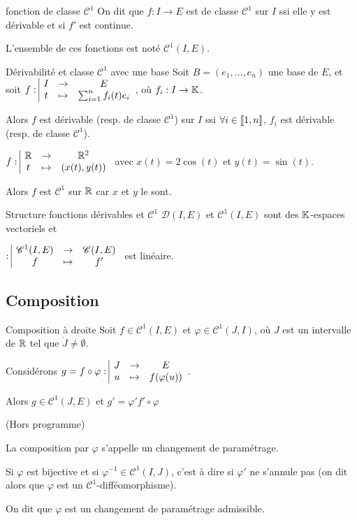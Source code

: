 \documentclass{prepacours}
\begin{document}
\begin{definition}{fonction de classe $\mathscr C^1$}{}
    On dit que $f : I \to E$ est de classe $\mathscr C^1$ sur $I$ ssi 
    elle y est dérivable et si $f'$ est continue. 

    L'ensemble de ces fonctions est noté $\mathscr C^1(I, E)$.
\end{definition}

\begin{proposition}{Dérivabilité et classe $\mathscr C^1$ avec une base }{}
    Soit $B = (e_1, \ldots, e_n)$ une base de $E$, et soit
    $\displaystyle f: \space \begin{array}{|ccc} I & \to & E \\ t & \mapsto & \sum_{i=1}^n f_i(t)e_i \end{array}$, où $f_i : I \to \mathbb{K}$.

    Alors $f$ est dérivable (resp. de classe $\mathscr C^1$) sur $I$ ssi
    $\forall i \in [\![1, n]\!]$, $f_i$ est dérivable (resp. de classe $\mathscr C^1$).
\end{proposition}

\begin{exemple}
    $f: \space \begin{array}{|ccc} \mathbb{R} & \to & \mathbb{R}^2 \\ t & \mapsto & (x(t), y(t)) \end{array}$ avec $x(t) = 2 \cos(t)$ et $y(t) = \sin(t)$.

    Alors $f$ est $\mathscr C^1$ sur $\mathbb{R}$ car $x$ et $y$ le sont.
\end{exemple}

\begin{proposition}{Structure fonctions dérivables et $\mathscr C^1$}{}
    $\mathscr D(I, E)$ et $\mathscr C^1(I, E)$ sont des $\mathbb{K}$-espaces vectoriels et 

    $: \space \begin{array}{|ccc} \mathscr C^1(I, E) & \to & \mathscr C(I, E) \\ f & \mapsto & f' \end{array}$ est linéaire. 
\end{proposition}

\subsection{Composition }

\begin{proposition}{Composition à droite}{}
    Soit $f \in \mathscr C^1(I, E)$ et $\varphi \in \mathscr C^1(J, I)$, où $J$ est un intervalle de $\mathbb{R}$
    tel que $\mathring{J } \neq \emptyset$. 

    Considérons $g = f \circ \varphi: \space \begin{array}{|ccc} J & \to & E \\ u & \mapsto & f(\varphi(u)) \end{array}$.

    Alors $g \in \mathscr C^1(J, E)$ et $g' = \varphi' f' \circ \varphi$
    
\end{proposition}

\begin{remarque}
    (Hors programme)

    La composition par $\varphi$ s'appelle un changement de paramétrage.

    Si $\varphi$ est bijective et si $\varphi^{-1} \in \mathscr C^1(I, J)$, c'est à dire si 
    $\varphi '$ ne s'annule pas (on dit alors que $\varphi$ est un $\mathscr C^1$-difféomorphisme). 

    On dit que $\varphi$ est un changement de paramétrage admissible.
\end{remarque}
\end{document}
